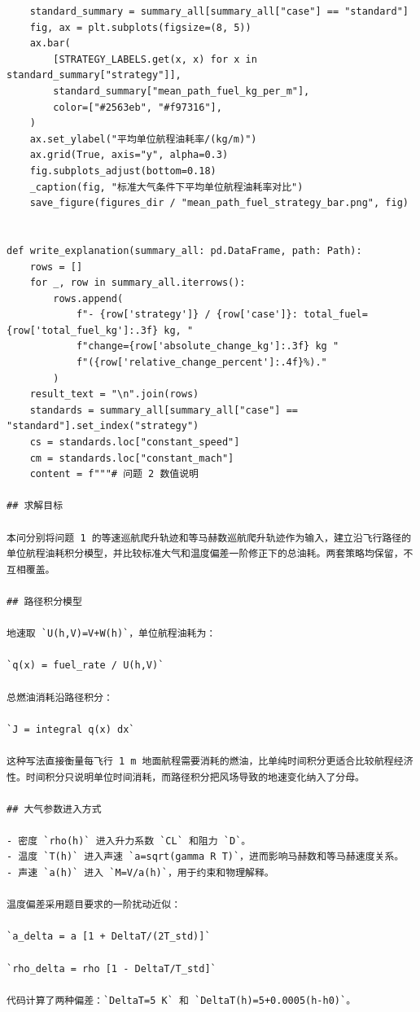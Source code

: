 \documentclass[UTF8]{ctexart}
\begin{document}
\begin{center}
\begin{lstlisting}
    standard_summary = summary_all[summary_all["case"] == "standard"]
    fig, ax = plt.subplots(figsize=(8, 5))
    ax.bar(
        [STRATEGY_LABELS.get(x, x) for x in standard_summary["strategy"]],
        standard_summary["mean_path_fuel_kg_per_m"],
        color=["#2563eb", "#f97316"],
    )
    ax.set_ylabel("平均单位航程油耗率/(kg/m)")
    ax.grid(True, axis="y", alpha=0.3)
    fig.subplots_adjust(bottom=0.18)
    _caption(fig, "标准大气条件下平均单位航程油耗率对比")
    save_figure(figures_dir / "mean_path_fuel_strategy_bar.png", fig)


def write_explanation(summary_all: pd.DataFrame, path: Path):
    rows = []
    for _, row in summary_all.iterrows():
        rows.append(
            f"- {row['strategy']} / {row['case']}: total_fuel={row['total_fuel_kg']:.3f} kg, "
            f"change={row['absolute_change_kg']:.3f} kg "
            f"({row['relative_change_percent']:.4f}%)."
        )
    result_text = "\n".join(rows)
    standards = summary_all[summary_all["case"] == "standard"].set_index("strategy")
    cs = standards.loc["constant_speed"]
    cm = standards.loc["constant_mach"]
    content = f"""# 问题 2 数值说明

## 求解目标

本问分别将问题 1 的等速巡航爬升轨迹和等马赫数巡航爬升轨迹作为输入，建立沿飞行路径的单位航程油耗积分模型，并比较标准大气和温度偏差一阶修正下的总油耗。两套策略均保留，不互相覆盖。

## 路径积分模型

地速取 `U(h,V)=V+W(h)`，单位航程油耗为：

`q(x) = fuel_rate / U(h,V)`

总燃油消耗沿路径积分：

`J = integral q(x) dx`

这种写法直接衡量每飞行 1 m 地面航程需要消耗的燃油，比单纯时间积分更适合比较航程经济性。时间积分只说明单位时间消耗，而路径积分把风场导致的地速变化纳入了分母。

## 大气参数进入方式

- 密度 `rho(h)` 进入升力系数 `CL` 和阻力 `D`。
- 温度 `T(h)` 进入声速 `a=sqrt(gamma R T)`，进而影响马赫数和等马赫速度关系。
- 声速 `a(h)` 进入 `M=V/a(h)`，用于约束和物理解释。

温度偏差采用题目要求的一阶扰动近似：

`a_delta = a [1 + DeltaT/(2T_std)]`

`rho_delta = rho [1 - DeltaT/T_std]`

代码计算了两种偏差：`DeltaT=5 K` 和 `DeltaT(h)=5+0.0005(h-h0)`。


\end{lstlisting}
\end{center}
\end{document}

